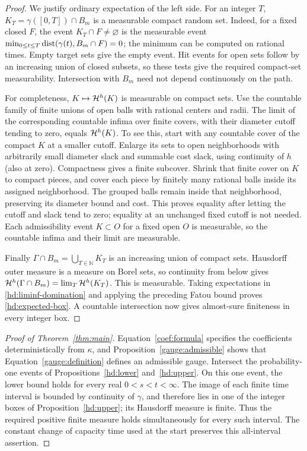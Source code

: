 \begin{proof}
We justify ordinary expectation of the left side. For an integer $T$,
$K_T=\gamma([0,T])\cap B_m$ is a measurable compact random set.
Indeed, for a fixed closed $F$, the event $K_T\cap F\ne\varnothing$
is the measurable event
$\min_{0\le t\le T}\operatorname{dist}(\gamma(t),B_m\cap F)=0$; the minimum can
be computed on rational times. Empty target sets give the empty event.
Hit events for open sets follow by an increasing union of closed
subsets, so these tests give the required compact-set measurability.
Intersection with $B_m$ need not depend continuously on the path.

For completeness, $K\mapsto\mathcal H^h(K)$ is measurable on compact sets.
Use the countable family of finite unions of open balls with rational
centers and radii. The limit of the corresponding countable infima
over finite covers, with their diameter cutoff tending to zero, equals
$\mathcal H^h(K)$. To see this, start with any countable cover of the compact
$K$ at a smaller cutoff. Enlarge its sets to open neighborhoods with
arbitrarily small diameter slack and summable cost slack, using
continuity of $h$ (also at zero). Compactness gives a finite subcover.
Shrink that finite cover on $K$ to compact pieces, and cover each piece
by finitely many rational balls inside its assigned neighborhood.
The grouped balls remain inside that neighborhood, preserving its
diameter bound and cost. This proves equality after letting the cutoff
and slack tend to zero; equality at an unchanged fixed cutoff is not
needed. Each admissibility event $K\subset O$ for a fixed open $O$
is measurable, so the countable infima and their limit are measurable.

Finally $\Gamma\cap B_m=\bigcup_{T\in\mathbb N}K_T$ is an increasing
union of compact sets. Hausdorff outer measure is a measure on Borel
sets, so continuity from below gives
$\mathcal H^h(\Gamma\cap B_m)=\lim_T\mathcal H^h(K_T)$.
This is measurable. Taking expectations in
\eqref{hd:liminf-domination} and applying the preceding Fatou bound
proves \eqref{hd:expected-box}. A countable intersection now gives
almost-sure finiteness in every integer box.
\end{proof}

\begin{proof}[Proof of Theorem~\ref{thm:main}]
Equation~\eqref{coef:formula} specifies the coefficients
deterministically from \(\kappa\), and
Proposition~\ref{gauge:admissible} shows that
Equation~\eqref{gauge:definition} defines an admissible gauge.
Intersect the probability-one events of
Propositions~\ref{hd:lower} and~\ref{hd:upper}.
On this one event, the lower bound holds for every real
\(0<s<t<\infty\).
The image of each finite time interval is bounded by continuity
of \(\gamma\), and therefore lies in one of the integer boxes
of Proposition~\ref{hd:upper}; its Hausdorff measure is finite.
Thus the required positive finite measure holds simultaneously
for every such interval. The constant change of capacity time
used at the start preserves this all-interval assertion.
\end{proof}
